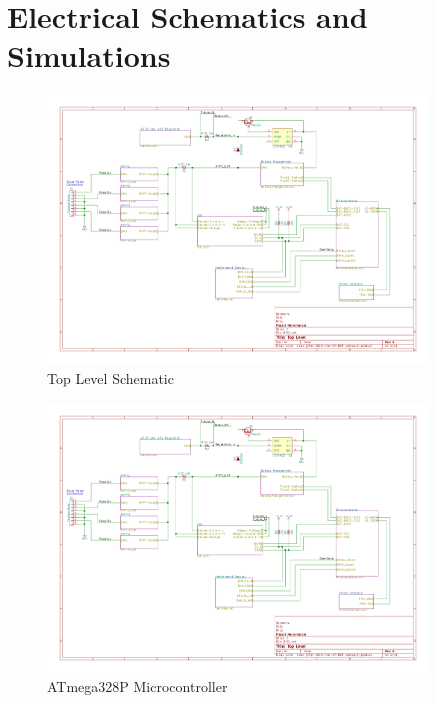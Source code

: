 \documentclass{article}
\makeatletter
\numberwithin{figure}{section}
\numberwithin{equation}{section}
\let\oldappendix\appendix %
\renewcommand\appendix{%
    \oldappendix
    \newcommand{\section@cntformat}{\appendixname~\thesection\quad}
}
\makeatother
\begin{document}
{\newpage
\vspace*{\fill}
\section*{}
\vspace*{\fill}
\newpage
\appendix
\section{Electrical Schematics and Simulations} \label{sect:appendixA}

\begin{figure}[H]
	\centering
	\includegraphics[page=1,width=0.9\textwidth]{RFCxSchematics.pdf}
	\caption{Top Level Schematic}
	\label{fig:schemp1}
\end{figure}

\begin{figure}[H]
	\centering
	\includegraphics[page=2,width=0.9\textwidth]{RFCxSchematics.pdf}
	\caption{ATmega328P Microcontroller}
	\label{fig:schemp2}
\end{figure}

}
\end{document}
